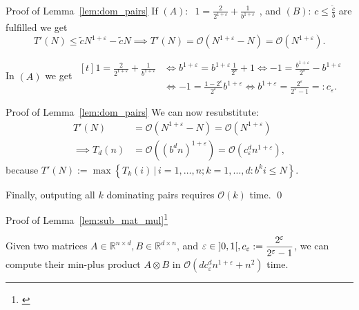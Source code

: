 \begin{frame}{Proof of Lemma~\ref{lem:dom_pairs}}
    If $(A)$: $\begin{aligned}1 = \frac{2}{2^{1 + \varepsilon}} + \frac{1}{b^{1 + \varepsilon}}\end{aligned}$, and $(B)$: $c \leq \frac{\tilde{c}}{b}$ are fulfilled we get
    \[
        T'(N) \leq \tilde{c} N^{1 + \varepsilon} - \tilde{c} N \implies T'(N) = \mathcal{O}\left( N^{1 + \varepsilon} - N \right) = \mathcal{O}\left( N^{1 + \varepsilon} \right).
    \]

    In $(A)$ we get $\begin{aligned}[t]
        1 = \frac{2}{2^{1 + \varepsilon}} + \frac{1}{b^{1 + \varepsilon}} &\iff b^{1 + \varepsilon} = b^{1 + \varepsilon} \frac{1}{2^\varepsilon} + 1 \iff -1 = \frac{b^{1 + \varepsilon}}{2^\varepsilon} - b^{1 + \varepsilon} \\
        &\iff -1 = \frac{1 - 2^\varepsilon}{2^\varepsilon} b^{1 + \varepsilon} \iff b^{1 + \varepsilon} = \frac{2^\varepsilon}{2^\varepsilon - 1} =: c_\varepsilon.
    \end{aligned}$
\end{frame}

\begin{frame}{Proof of Lemma~\ref{lem:dom_pairs}}
    We can now resubstitute:    
    \begin{align*}
        T'(N) &= \mathcal{O}\left( N^{1 + \varepsilon} - N \right) = \mathcal{O}\left( N^{1 + \varepsilon} \right) \\
        \implies T_d(n) &= \mathcal{O}\left( {\left( b^d n \right)}^{1 + \varepsilon} \right) = \mathcal{O}\left( c_\varepsilon^d n^{1 + \varepsilon} \right),
    \end{align*}
    because $T'(N) := \max \left\{ T_k(i) \,|\, i = 1, \dots, n; k = 1, \dots, d: b^k i \leq N \right\}$. 
    
    Finally, outputing all $k$ dominating pairs requires $\mathcal{O}\left( k \right)$ time. \qed{}
\end{frame}

\begin{frame}{Proof of Lemma~\ref{lem:sub_mat_mul}\footnote[1]{\cite[Lemma~3.1]{Chan2007}}}
    \setcounter{theorem}{1}
    \begin{lemma}
        Given two matrices $A \in \mathbb{R}^{n \times d}, B \in \mathbb{R}^{d \times n}$, and $\varepsilon \in \interval[open]{0}{1}, \begin{aligned}c_\varepsilon := \frac{2^\varepsilon}{2^\varepsilon - 1}\end{aligned}$, we can compute their min-plus product $A \otimes B$ in $\mathcal{O}\left( d c_\varepsilon^d n^{1 + \varepsilon} + n^2 \right)$ time.
    \end{lemma}
\end{frame}

